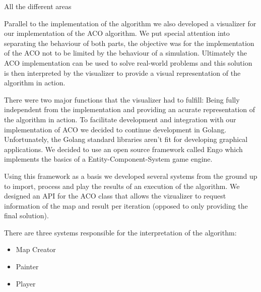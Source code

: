 \documentclass[times, 10pt,twocolumn]{article}
\begin{document}
	All the different areas
	

         Parallel to the implementation of the algorithm we also developed a visualizer for
    our implementation of the ACO algorithm. We put special attention into separating the
    behaviour of both parts, the objective was for the implementation of the ACO not to
    be limited by the behaviour of a simulation. Ultimately the ACO implementation can
    be used to solve real-world problems and this solution is then interpreted by the visualizer
    to provide a visual representation of the algorithm in action.
    


        There were two major functions that the visualizer had to fulfill: Being fully 
    independent from the implementation and providing an acurate representation of the algorithm
    in action. To facilitate development and integration with our implementation of ACO we 
    decided to continue development in Golang. Unfortunately, the Golang standard libraries
    aren't fit for developing graphical applications. We decided to use an open source framework
    called Engo which implements the basics of a Entity-Component-System game engine. 

        Using this framework as a basis we developed several systems from the ground up 
    to import, process and play the results of an execution of the algorithm. We designed
    an API for the ACO class that allows the vizualizer to request information of the map and
    result per iteration (opposed to only providing the final solution). 

        There are three systems responsible for the interpretation of the algorithm:

    \begin{itemize}
        \item Map Creator
        \item Painter
        \item Player
    \end{itemize}
\end{document}
